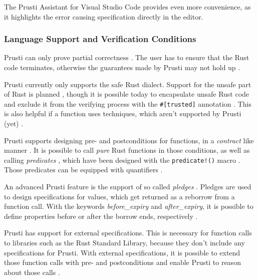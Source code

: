 The Prusti Assistant for Visual Studio Code provides even more convenience, as it highlights the error causing specification directly in the editor.

\subsubsection{Language Support and Verification Conditions}
\label{cap:prusti_language_verification}

Prusti can only prove partial correctness \cite{prusti_user_guide_verification_2023}. The user has to ensure that the Rust code terminates, otherwise the guarantees made by Prusti may not hold up \cite{prusti_user_guide_verification_2023}.

Prusti currently only supports the safe Rust dialect. Support for the unsafe part of Rust is planned \cite{astrauskas_leveraging_2019}, though it is possible today to encapsulate unsafe Rust code and exclude it from the verifying process with the \lstinline{#[trusted]} annotation \cite{prusti_user_guide_trusted_2023}. This is also helpful if a function uses techniques, which aren't supported by Prusti (yet) \cite{prusti_user_guide_trusted_2023}.

Prusti supports designing pre- and postconditions for functions, in a \textit{contract} like manner \cite{deshmukh_prusti_2022, astrauskas_leveraging_2019}. It is possible to call \textit{pure} Rust functions in those conditions, as well as calling \textit{predicates} \cite{prusti_user_guide_predicates_2023}, which have been designed with the \lstinline{predicate!()} macro \cite{deshmukh_prusti_2022}. Those predicates can be equipped with quantifiers \cite{deshmukh_prusti_2022}. 

An advanced Prusti feature is the support of so called \textit{pledges} \cite{astrauskas_leveraging_2019}. Pledges are used to design specifications for values, which get returned as a reborrow from a function call. With the keywords \textit{before\_expiry} and \textit{after\_expiry}, it is possible to define properties before or after the borrow ends, respectively \cite{prusti_user_guide_pledges_2023}.

Prusti has support for external specifications. This is necessary for function calls to libraries such as the Rust Standard Library, because they don't include any specifications for Prusti. With external specifications, it is possible to extend those function calls with pre- and postconditions and enable Prusti to reason about those calls \cite{deshmukh_prusti_2022,prusti_user_guide_external_2023}. 

